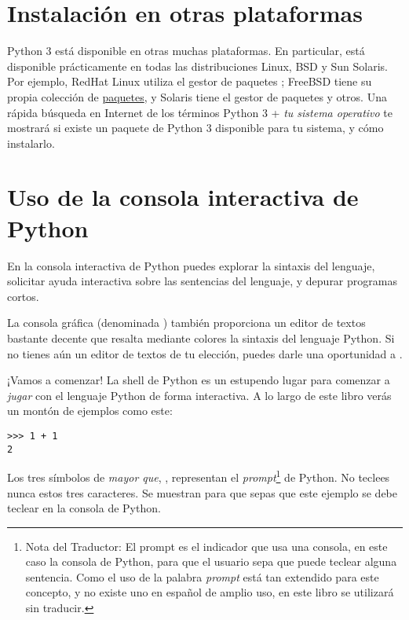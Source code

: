 \section{Instalación en otras plataformas}

Python 3 está disponible en otras muchas plataformas. En particular, está disponible prácticamente en todas las distribuciones Linux, BSD y Sun Solaris. Por ejemplo, RedHat Linux utiliza el gestor de paquetes ; FreeBSD tiene su propia colección de \href{http://www.freebsd.org/ports/}{paquetes}, y Solaris tiene el gestor de paquetes  y otros. Una rápida búsqueda en Internet de los términos Python 3 + \emph{tu sistema operativo} te mostrará si existe un paquete de Python 3 disponible para tu sistema, y cómo instalarlo.

\section{Uso de la consola interactiva de Python}\label{sec:shell}

En la consola interactiva de Python puedes explorar la sintaxis del lenguaje, solicitar ayuda interactiva sobre las sentencias del lenguaje, y depurar programas cortos.

La consola gráfica (denominada ) también proporciona un editor de textos bastante decente que resalta mediante colores la sintaxis del lenguaje Python. Si no tienes aún un editor de textos de tu elección, puedes darle una oportunidad a .

¡Vamos a comenzar! La shell de Python es un estupendo lugar para comenzar a \emph{jugar} con el lenguaje Python de forma interactiva.  A lo largo de este libro verás un montón de ejemplos como este:

\begin{listing}
\begin{verbatim}
>>> 1 + 1
2
\end{verbatim}
\end{listing}

Los tres símbolos de \emph{mayor que}, \codigo{$>>>$}, representan el \emph{prompt}\footnote{Nota del Traductor: El prompt es el indicador que usa una consola, en este caso la consola de Python, para que el usuario sepa que puede teclear alguna sentencia. Como el uso de la palabra \emph{prompt} está tan extendido para este concepto, y no existe uno en español de amplio uso, en este libro se utilizará sin traducir.} de Python. No teclees nunca estos tres caracteres. Se muestran para que sepas que este ejemplo se debe teclear en la consola de Python.

